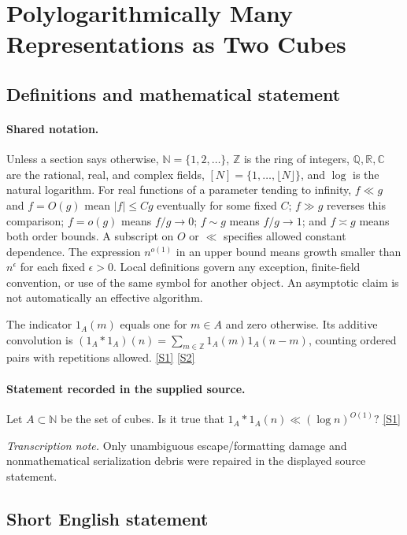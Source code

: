 \documentclass[11pt,a4paper]{article}
\newcommand{\N}{\mathbb{N}}
\newcommand{\Z}{\mathbb{Z}}
\newcommand{\Q}{\mathbb{Q}}
\newcommand{\R}{\mathbb{R}}
\newcommand{\C}{\mathbb{C}}
\newcommand{\sref}[2]{\hyperlink{source:#1:#2}{[S#2]}}
\begin{document}
\section{Polylogarithmically Many Representations as Two Cubes}\label{statement}


\subsection{Definitions and mathematical statement}

\paragraph{Shared notation.}Unless a section says otherwise, $\N=\{1,2,\ldots\}$,
$\Z$ is the ring of integers, $\Q,\R,\C$ are the rational, real, and complex
fields, $[N]=\{1,\ldots,\lfloor N\rfloor\}$, and $\log$ is the natural
logarithm. For real functions of a parameter tending to infinity,
$f\ll g$ and $f=O(g)$ mean $|f|\leq Cg$ eventually for some fixed $C$;
$f\gg g$ reverses this comparison; $f=o(g)$ means $f/g\to0$;
$f\sim g$ means $f/g\to1$; and $f\asymp g$ means both order bounds.
A subscript on $O$ or $\ll$ specifies allowed constant dependence.
The expression $n^{o(1)}$ in an upper bound means growth smaller than
$n^\epsilon$ for each fixed $\epsilon>0$. Local definitions govern any
exception, finite-field convention, or use of the same symbol for another
object. An asymptotic claim is not automatically an effective algorithm.



The indicator $1_A(m)$ equals one for $m\in A$ and zero otherwise. Its additive convolution is $(1_A*1_A)(n)=\sum_{m\in\Z}1_A(m)1_A(n-m)$, counting ordered pairs with repetitions allowed. \sref{statement}{1} \sref{statement}{2}

\paragraph{Statement recorded in the supplied source.}
Let $A\subset\mathbb{N}$ be the set of cubes. Is it true that $ 1_A\ast 1_A(n) \ll (\log n)^{O(1)}? $ \sref{statement}{1}

{\small\emph{Transcription note.} Only unambiguous escape/formatting damage and nonmathematical serialization debris were repaired in the displayed source statement.}

\subsection{Short English statement}
\end{document}
